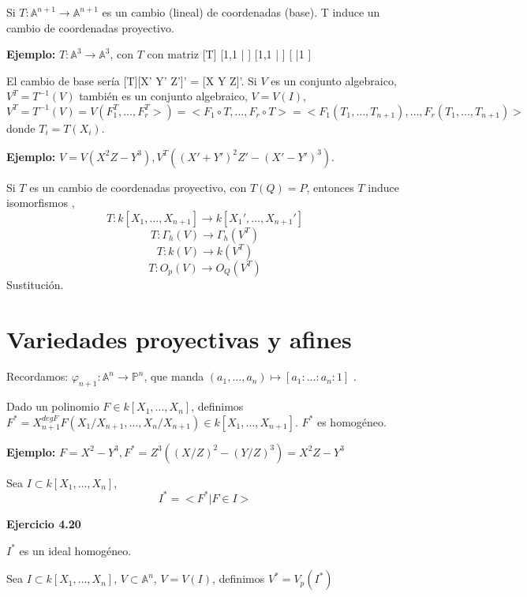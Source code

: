 Si $T: \mathbb{A}^{n+1}\rightarrow \mathbb{A}^{n+1}$ es un cambio (lineal) de coordenadas (base). T induce un cambio de coordenadas proyectivo. 

\textbf{Ejemplo: } $T:\mathbb{A}^3 \rightarrow \mathbb{A}^3$, con $T$ con matriz [T]
[1,1 |  ]
[1,1 |  ]
[    |1 ]

El cambio de base sería [T][X' Y' Z']' = [X Y Z]'. Si $V$ es un conjunto algebraico, $V^T = T^{-1}(V)$ también es un conjunto algebraico, $V=V(I)$, 
$$V^T=T^{-1}(V) =V(F_1^T,\dots , F_r^T >) = <F_1\circ T, \dots , F_r \circ T > = <F_1(T_1,\dots , T_{n+1}),\dots , F_r(T_1,\dots , T_{n+1})>  $$
donde $T_i= T(X_i)$.


\textbf{Ejemplo: } $V=V(X^2Z-Y^3), V^T((X'+Y')^2Z'-(X'-Y')^3)$. 


\begin{Prop}
Si $T$ es un cambio de coordenadas proyectivo, con $T(Q)=P$, entonces $T$ induce isomorfismos , 
$$T:k[X_1,\dots, X_{n+1}] \rightarrow k[X_1',\dots , X_{n+1}']$$
$$T: \Gamma_h(V) \rightarrow \Gamma_h(V^T)$$
$$T: k(V) \rightarrow k(V^T)$$
$$T: O_p(V)\rightarrow O_Q(V^T)$$
Sustitución. 
\end{Prop}

\section{Variedades proyectivas y afines}

Recordamos: $\varphi_{n+1}: \mathbb{A}^n \rightarrow \mathbb{P}^{n}$, que manda $(a_1,\dots , a_n) \mapsto [a_1:\dots : a_n : 1]$ .


Dado un polinomio $F\in k[X_1,\dots , X_n]$, definimos $F^*=X_{n+1}^{deg F}F(X_1/X_{n+1},\dots , X_n/X_{n+1})\in k[X_1,\dots , X_{n+1}].$ $F^*$ es homogéneo. 

\textbf{Ejemplo: } $F=X^2-Y^3, F^*= Z^3((X/Z)^2-(Y/Z)^3)=X^2Z-Y^3$

\begin{Def}
Sea $I\subset k[X_1,\dots , X_n] $,
$$ I^* = < F^* | F \in I > $$
\end{Def}

\textbf{Ejercicio 4.20}

\begin{nota}
$I^*$ es un ideal homogéneo. 
\end{nota}

\begin{Def}
Sea $I\subset k[X_1,\dots, X_n]$, $V\subset \mathbb{A}^n$, $V=V(I)$, definimos $V^*=V_p(I^*) $
\end{Def}


